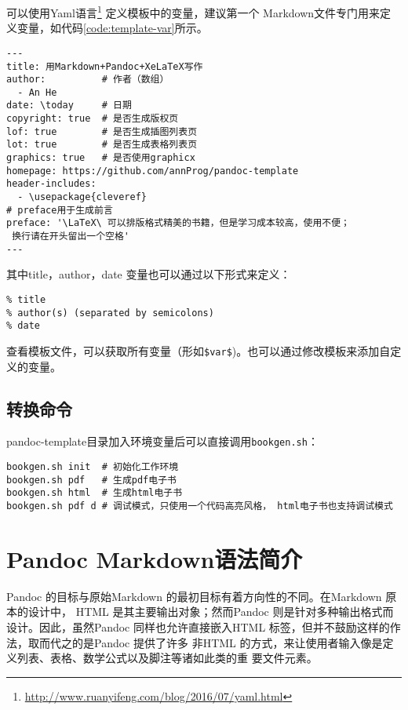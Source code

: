 \documentclass[fancyhdr,bookmark]{ctexbook}
\newcommand{\passthrough}[1]{#1}
\renewcommand{\href}[2]{#2\footnote{\url{#1}}}
\begin{document}
可以使用\href{http://www.ruanyifeng.com/blog/2016/07/yaml.html}{Yaml语言}
定义模板中的变量，建议第一个
Markdown文件专门用来定义变量，如代码\ref{code:template-var}所示。

\begin{lstlisting}[label=code:template-var, caption=code:template-var, float=htbp]
---
title: 用Markdown+Pandoc+XeLaTeX写作
author:          # 作者（数组）
  - An He
date: \today     # 日期
copyright: true  # 是否生成版权页
lof: true        # 是否生成插图列表页
lot: true        # 是否生成表格列表页
graphics: true   # 是否使用graphicx
homepage: https://github.com/annProg/pandoc-template
header-includes:
  - \usepackage{cleveref}
# preface用于生成前言
preface: '\LaTeX\ 可以排版格式精美的书籍，但是学习成本较高，使用不便；
 换行请在开头留出一个空格'
---
\end{lstlisting}

其中title，author，date 变量也可以通过以下形式来定义：

\begin{lstlisting}
% title
% author(s) (separated by semicolons)
% date
\end{lstlisting}

查看模板文件，可以获取所有变量（形如\passthrough{\lstinline!$var$!})。也可以通过修改模板来添加自定义的变量。

\hypertarget{ux8f6cux6362ux547dux4ee4}{%
\section{转换命令}\label{ux8f6cux6362ux547dux4ee4}}

pandoc-template目录加入环境变量后可以直接调用\passthrough{\lstinline!bookgen.sh!}：

\begin{lstlisting}
bookgen.sh init  # 初始化工作环境
bookgen.sh pdf   # 生成pdf电子书
bookgen.sh html  # 生成html电子书
bookgen.sh pdf d # 调试模式，只使用一个代码高亮风格， html电子书也支持调试模式
\end{lstlisting}

\hypertarget{pandoc-markdownux8bedux6cd5ux7b80ux4ecb}{%
\chapter{Pandoc
Markdown语法简介}\label{pandoc-markdownux8bedux6cd5ux7b80ux4ecb}}

Pandoc 的目标与原始Markdown 的最初目标有着方向性的不同。在Markdown
原本的设计中， HTML 是其主要输出对象；然而Pandoc
则是针对多种输出格式而设计。因此，虽然Pandoc 同样也允许直接嵌入HTML
标签，但并不鼓励这样的作法，取而代之的是Pandoc 提供了许多 非HTML
的方式，来让使用者输入像是定义列表、表格、数学公式以及脚注等诸如此类的重
要文件元素。
\end{document}
